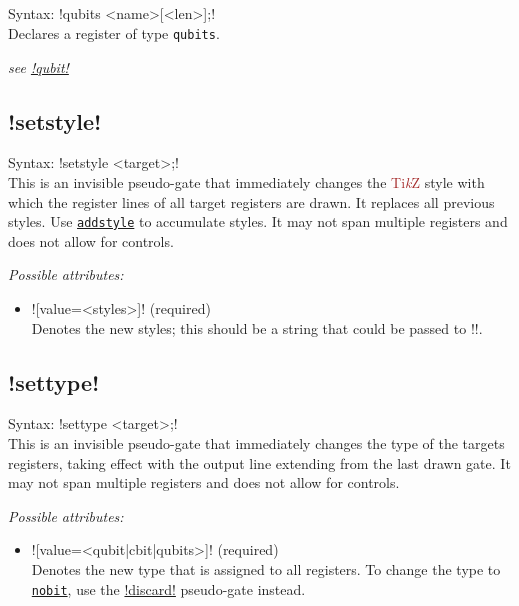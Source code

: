 \documentclass{scrartcl}
\def\TikZ{\textcolor{brown}{Ti\textit kZ}}
\def\gate#1{\hyperref[gate:#1]{\texttt{#1}}}
\begin{document}
      \subsection{\texorpdfstring{}{qubits}}\label{gate:qubits}
         Syntax: \yquant!qubits <name>[<len>];! \\
         Declares a register of type \texttt{qubits}.

         \emph{see \hyperref[gate:qubit]{\yquant!qubit!}}

      \subsection[\texorpdfstring{\yquant{setstyle}}{setstyle}]{\yquant!setstyle!}\label{gate:setstyle}
         Syntax: \yquant!setstyle <target>;! \\
         This is an invisible pseudo\hyp gate that immediately changes the \TikZ{} style with which the register lines of all target registers are drawn.
         It replaces all previous styles.
         Use \gate{addstyle} to accumulate styles.
         It may not span multiple registers and does not allow for controls.

         \emph{Possible attributes:}
         \begin{itemize}
            \item \yquant![value=<styles>]! (required) \\
               Denotes the new styles; this should be a string that could be passed to \tex!\tikzset!.
         \end{itemize}

      \subsection[\texorpdfstring{\yquant{settype}}{settype}]{\yquant!settype!}\label{gate:settype}
         Syntax: \yquant!settype <target>;! \\
         This is an invisible pseudo\hyp gate that immediately changes the type of the targets registers, taking effect with the output line extending from the last drawn gate.
         It may not span multiple registers and does not allow for controls.

         \emph{Possible attributes:}
         \begin{itemize}
            \item \yquant![value=<qubit|cbit|qubits>]! (required) \\
               Denotes the new type that is assigned to all registers.
               To change the type to \gate{nobit}, use the \hyperref[gate:discard]{\yquant!discard!} pseudo\hyp gate instead.
         \end{itemize}
\end{document}
